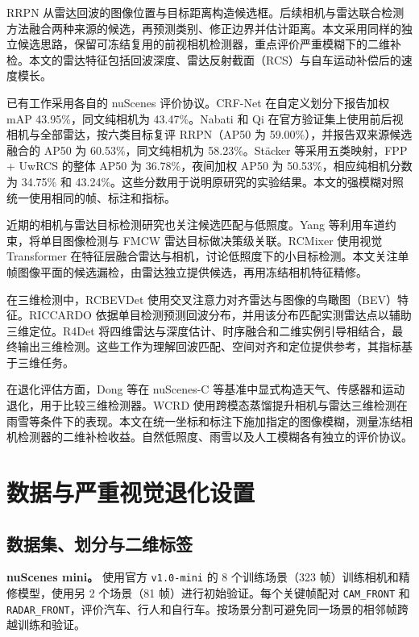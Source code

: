 \documentclass[conference,10pt,a4paper]{IEEEtran}
\begin{document}
RRPN 从雷达回波的图像位置与目标距离构造候选框\cite{rrpn}。后续相机与雷达联合检测方法融合两种来源的候选，再预测类别、修正边界并估计距离\cite{joint}。本文采用同样的独立候选思路，保留可冻结复用的前视相机检测器，重点评价严重模糊下的二维补检。本文的雷达特征包括回波深度、雷达反射截面（RCS）与自车运动补偿后的速度模长。

已有工作采用各自的 nuScenes 评价协议。CRF-Net 在自定义划分下报告加权 mAP 43.95\%，同文纯相机为 43.47\%\cite{nobis}。Nabati 和 Qi 在官方验证集上使用前后视相机与全部雷达，按六类目标复评 RRPN（AP50 为 59.00\%），并报告双来源候选融合的 AP50 为 60.53\%，同文纯相机为 58.23\%\cite{joint}。Stäcker 等采用五类映射，FPP + UwRCS 的整体 AP50 为 36.78\%，夜间加权 AP50 为 50.53\%，相应纯相机分数为 34.75\% 和 43.24\%\cite{stacker}。这些分数用于说明原研究的实验结果。本文的强模糊对照统一使用相同的帧、标注和指标。

近期的相机与雷达目标检测研究也关注候选匹配与低照度。Yang 等利用车道约束，将单目图像检测与 FMCW 雷达目标做决策级关联\cite{yangfmcw}。RCMixer 使用视觉 Transformer 在特征层融合雷达与相机，讨论低照度下的小目标检测\cite{rcmixer}。本文关注单帧图像平面的候选漏检，由雷达独立提供候选，再用冻结相机特征精修。

在三维检测中，RCBEVDet 使用交叉注意力对齐雷达与图像的鸟瞰图（BEV）特征\cite{rcbevdet}。RICCARDO 依据单目检测预测回波分布，并用该分布匹配实测雷达点以辅助三维定位\cite{riccardo}。R4Det 将四维雷达与深度估计、时序融合和二维实例引导相结合，最终输出三维检测\cite{r4det}。这些工作为理解回波匹配、空间对齐和定位提供参考，其指标基于三维任务。

在退化评估方面，Dong 等在 nuScenes-C 等基准中显式构造天气、传感器和运动退化，用于比较三维检测器\cite{dongcorruptions}。WCRD 使用跨模态蒸馏提升相机与雷达三维检测在雨雪等条件下的表现\cite{wcrd}。本文在统一坐标和标注下施加指定的图像模糊，测量冻结相机检测器的二维补检收益。自然低照度、雨雪以及人工模糊各有独立的评价协议。

\section{数据与严重视觉退化设置}
\subsection{数据集、划分与二维标签}
\textbf{nuScenes mini。} 使用官方 \texttt{v1.0-mini} 的 8 个训练场景（323 帧）训练相机和精修模型，使用另 2 个场景（81 帧）进行初始验证。每个关键帧配对 \texttt{CAM\_FRONT} 和 \texttt{RADAR\_FRONT}，评价汽车、行人和自行车。按场景分割可避免同一场景的相邻帧跨越训练和验证。
\end{document}
